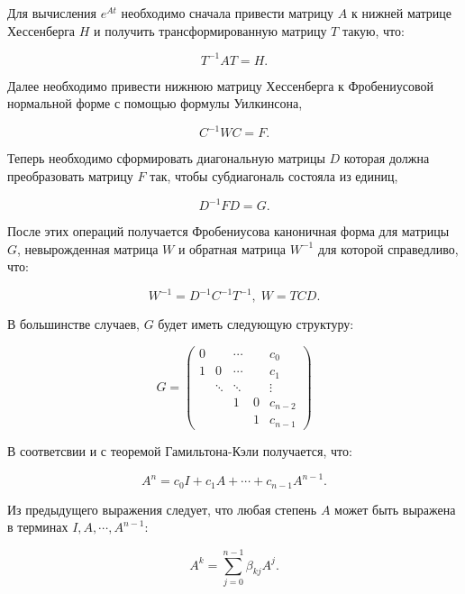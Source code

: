 \documentclass[master, och, diploma, times]{sty/SCWorks}
\theoremstyle{plain}
\theoremstyle{definition}
\begin{document}
Для вычисления $e^{At}$ необходимо сначала привести матрицу $A$ к нижней матрице Хессенберга $H$ и получить трансформированную матрицу $T$ такую, что:

\begin{equation}
T^{-1}AT=H.
\end{equation} 

Далее необходимо привести нижнюю матрицу Хессенберга к Фробениусовой нормальной форме с помощью формулы Уилкинсона,

\begin{equation}
C^{-1}WC=F.
\end{equation}

Теперь необходимо сформировать диагональную матрицы $D$ которая должна преобразовать матрицу $F$ так, чтобы субдиагональ состояла из единиц,

\begin{equation}
D^{-1}FD=G.
\end{equation}

После этих операций получается Фробениусова каноничная форма для матрицы $G$, невырожденная матрица $W$ и обратная матрица $W^{-1}$ для которой справедливо, что:

\begin{equation}
W^{-1}=D^{-1}C^{-1}T^{-1}, \; W=TCD.
\end{equation}
 
В большинстве случаев, $G$ будет иметь следующую структуру:

\begin{equation}G=
\begin{pmatrix}
0 & & \cdots & & c_0\\
1 & 0 & \cdots & & c_1\\
& \ddots & \ddots & & \vdots \\
& & 1 & 0 & c_{n-2} \\
& & & 1 & c_{n-1}
\end{pmatrix}
\end{equation}
 
\noindent В соответсвии и с теоремой Гамильтона-Кэли \cite{bib:algebra:roitenberg} получается, что:

\begin{equation}
A^n=c_0I+c_1A+\cdots+c_{n-1}A^{n-1}.
\end{equation}

Из предыдущего выражения следует, что любая степень $A$ может быть выражена в терминах $I, A, \cdots, A^{n-1}$:

\begin{equation}
A^k=\sum\limits_{j=0}^{n-1} \beta_{kj}A^j.
\end{equation}
\end{document}
